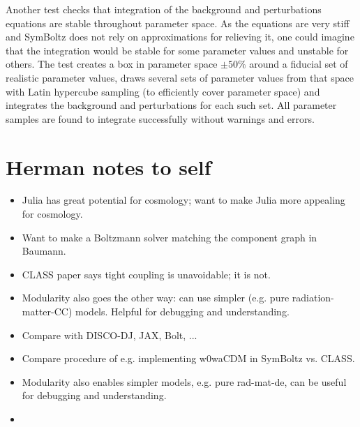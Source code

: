 \documentclass{aa}
\begin{document}
Another test checks that integration of the background and perturbations equations are stable throughout parameter space.
As the equations are very stiff and SymBoltz does not rely on approximations for relieving it, one could imagine that the integration would be stable for some parameter values and unstable for others.
The test creates a box in parameter space $\pm 50\%$ around a fiducial set of realistic parameter values, draws several sets of parameter values from that space with Latin hypercube sampling (to efficiently cover parameter space) and integrates the background and perturbations for each such set.
All parameter samples are found to integrate successfully without warnings and errors.

\iffalse
\pagebreak

\section{Herman notes to self}

\begin{itemize}
\item Julia has great potential for cosmology; want to make Julia more appealing for cosmology.
\item Want to make a Boltzmann solver matching the component graph in Baumann.
\item CLASS paper says tight coupling is unavoidable; it is not.
\item Modularity also goes the other way: can use simpler (e.g. pure radiation-matter-CC) models. Helpful for debugging and understanding.
\item Compare with DISCO-DJ, JAX, Bolt, ...
\item Compare procedure of e.g. implementing w0waCDM in SymBoltz vs. CLASS.
\item Modularity also enables simpler models, e.g. pure rad-mat-de, can be useful for debugging and understanding.
\item {\color{red}{Also some about disadvantages/tradeoffs: computational speed vs modularity/easy to work with, ...}}
\end{itemize}
\end{document}
